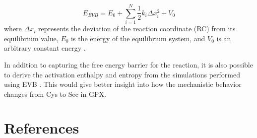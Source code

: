 \documentclass[journal=jacsat,manuscript=article]{achemso}
\begin{document}
\begin{equation}
    E_{EVB} =  E_{0} + \sum_{i=1}^{N} \frac{1}{2} k_i \Delta x_i^{2} + V_{0}
\end{equation}
where \(\Delta x_i\) represents the deviation of the reaction coordinate (RC) from its equilibrium value, \(E_0\) is the energy of the equilibrium system, and \(V_0\) is an arbitrary constant energy \cite{Oanca2024}. 

In addition to capturing the free energy barrier for the reaction, it is also possible to derive the activation enthalpy and entropy from the simulations performed using EVB \cite{Oanca2024}. This would give better insight into how the mechanistic behavior changes from Cys to Sec in GPX. 

\section{References}
 

\end{document}
